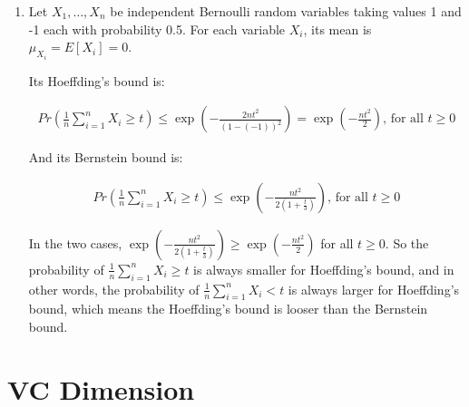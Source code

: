 \documentclass[paper=letter, fontsize=12pt]{article}
\begin{document}
\begin{enumerate}[label=(\alph*)]
	\item Let $X_1, \dots, X_n$ be independent Bernoulli random variables taking values 1 and -1 each with probability 0.5. For each variable $X_i$, its mean is $\mu_{X_i} = E[X_i] = 0$.
	
	Its Hoeffding's bound is:
	
	\begin{align*}
	Pr(\frac{1}{n} \sum_{i = 1}^{n} X_i \geq t) \leq \exp (- \frac{2nt^2}{(1 - (-1))^2}) = \exp (- \frac{nt^2}{2}) \text{, for all } t \geq 0
	\end{align*}
	
	And its Bernstein bound is:
	
	\begin{align*}
	Pr(\frac{1}{n} \sum_{i = 1}^{n} X_i \geq t) \leq \exp (- \frac{nt^2}{2(1 + \frac{t}{3})}) \text{, for all } t \geq 0
	\end{align*}
	
	In the two cases, $\exp (- \frac{nt^2}{2(1 + \frac{t}{3})}) \geq  \exp (- \frac{nt^2}{2})$ for all $t \geq 0$. So the probability of $\frac{1}{n} \sum_{i = 1}^{n} X_i \geq t$ is always smaller for Hoeffding's bound, and in other words, the probability of $\frac{1}{n} \sum_{i = 1}^{n} X_i < t$ is always larger for Hoeffding's bound, which means the Hoeffding's bound is looser than the Bernstein bound. 

\end{enumerate}

\section{VC Dimension}
\end{document}
